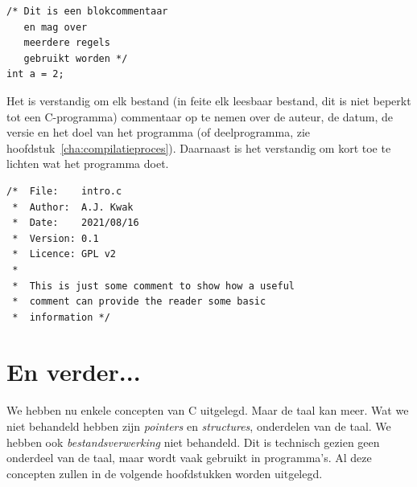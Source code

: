 \begin{lstlisting}[caption=Voorbeeld van commentaarregels.]
/* Dit is een blokcommentaar
   en mag over
   meerdere regels
   gebruikt worden */
int a = 2;
\end{lstlisting}

Het is verstandig om elk bestand (in feite elk leesbaar bestand, dit is niet beperkt tot een C-programma) commentaar op te nemen over de auteur, de datum, de versie en het doel van het programma (of deelprogramma, zie hoofdstuk~\ref{cha:compilatieproces}). Daarnaast is het verstandig om kort toe te lichten wat het programma doet.

\begin{lstlisting}[caption=Commentaar aan het begin van het bestand.]
/*  File:    intro.c
 *  Author:  A.J. Kwak
 *  Date:    2021/08/16
 *  Version: 0.1
 *  Licence: GPL v2
 *  
 *  This is just some comment to show how a useful
 *  comment can provide the reader some basic
 *  information */
\end{lstlisting}



\section{En verder...}
We hebben nu enkele concepten van C uitgelegd. Maar de taal kan meer. Wat we niet behandeld hebben zijn \textsl{pointers} en \textsl{structures}, onderdelen van de taal. We hebben ook \textsl{bestandsverwerking} niet behandeld. Dit is technisch gezien geen onderdeel van de taal, maar wordt vaak gebruikt in programma's. Al deze concepten zullen in de volgende hoofdstukken worden uitgelegd.
